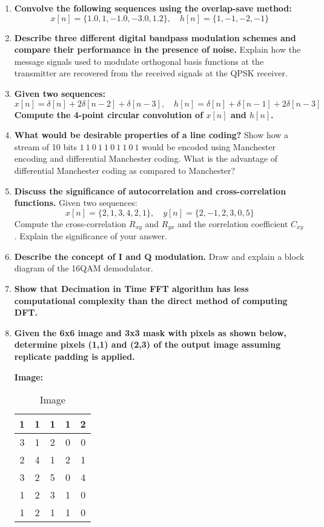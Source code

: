 \begin{enumerate}
    \item \textbf{Convolve the following sequences using the overlap-save method:}
    \[
    x[n] = \{1.0, 1, -1.0, -3.0, 1.2\}, \quad h[n] = \{1, -1, -2, -1\}
    \]

    \item \textbf{Describe three different digital bandpass modulation schemes and compare their performance in the presence of noise.}
    Explain how the message signals used to modulate orthogonal basis functions at the transmitter are recovered from the received signals at the QPSK receiver.

    \item \textbf{Given two sequences:}
    \[
    x[n] = \delta[n] + 2\delta[n-2] + \delta[n-3], \quad h[n] = \delta[n] + \delta[n-1] + 2\delta[n-3]
    \]
    \textbf{Compute the 4-point circular convolution of \(x[n]\) and \(h[n]\).}

    \item \textbf{What would be desirable properties of a line coding?}
    Show how a stream of 10 bits \(1\ 1\ 0\ 1\ 1\ 0\ 1\ 1\ 0\ 1\) would be encoded using Manchester encoding and differential Manchester coding. What is the advantage of differential Manchester coding as compared to Manchester?

    \item \textbf{Discuss the significance of autocorrelation and cross-correlation functions.}  
    Given two sequences:  
    \[
    x[n] = \{2, 1, 3, 4, 2, 1\}, \quad y[n] = \{2, -1, 2, 3, 0, 5\}
    \]
    Compute the cross-correlation \(R_{xy}\) and \(R_{yx}\) and the correlation coefficient \(C_{xy}\).  
    Explain the significance of your answer.

    \item \textbf{Describe the concept of I and Q modulation.}  
    Draw and explain a block diagram of the 16QAM demodulator.

    \item \textbf{Show that Decimation in Time FFT algorithm has less computational complexity than the direct method of computing DFT.}

    \item \textbf{Given the 6x6 image and 3x3 mask with pixels as shown below, determine pixels (1,1) and (2,3) of the output image assuming replicate padding is applied.}

    \textbf{Image:}
    \begin{table}[h!]
\centering
\begin{tabular}{|c|c|c|c|c|}
\hline
1 & 1 & 1 & 1 & 2 \\
\hline
3 & 1 & 2 & 0 & 0 \\
\hline
2 & 4 & 1 & 2 & 1 \\
\hline
3 & 2 & 5 & 0 & 4 \\
\hline
1 & 2 & 3 & 1 & 0 \\
\hline
1 & 2 & 1 & 1 & 0 \\
\hline
\end{tabular}
\caption{Image}
\end{table}


\end{enumerate}
